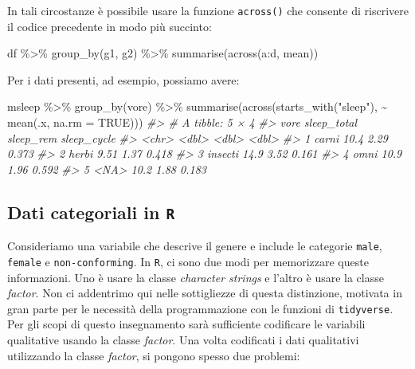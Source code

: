 \documentclass[
  10pt,
  italian,
  a4paper,
  extrafontsizes,onecolumn,openright
  ]{memoir}
\newenvironment{Shaded}{\begin{snugshade}}{\end{snugshade}}
\newcommand{\AttributeTok}[1]{\textcolor[rgb]{0.77,0.63,0.00}{#1}}
\newcommand{\CommentTok}[1]{\textcolor[rgb]{0.56,0.35,0.01}{\textit{#1}}}
\newcommand{\ConstantTok}[1]{\textcolor[rgb]{0.00,0.00,0.00}{#1}}
\newcommand{\FunctionTok}[1]{\textcolor[rgb]{0.00,0.00,0.00}{#1}}
\newcommand{\NormalTok}[1]{#1}
\newcommand{\SpecialCharTok}[1]{\textcolor[rgb]{0.00,0.00,0.00}{#1}}
\newcommand{\StringTok}[1]{\textcolor[rgb]{0.31,0.60,0.02}{#1}}
\begin{document}
\noindent
In tali circostanze è possibile usare la funzione \texttt{across()} che consente di riscrivere il codice precedente in modo più succinto:

\begin{Shaded}
\begin{Highlighting}[]
\NormalTok{df }\SpecialCharTok{\%\textgreater{}\%} 
  \FunctionTok{group\_by}\NormalTok{(g1, g2) }\SpecialCharTok{\%\textgreater{}\%} 
  \FunctionTok{summarise}\NormalTok{(}\FunctionTok{across}\NormalTok{(a}\SpecialCharTok{:}\NormalTok{d, mean))}
\end{Highlighting}
\end{Shaded}

\noindent
Per i dati presenti, ad esempio, possiamo avere:

\begin{Shaded}
\begin{Highlighting}[]
\NormalTok{msleep }\SpecialCharTok{\%\textgreater{}\%}
  \FunctionTok{group\_by}\NormalTok{(vore) }\SpecialCharTok{\%\textgreater{}\%}
  \FunctionTok{summarise}\NormalTok{(}\FunctionTok{across}\NormalTok{(}\FunctionTok{starts\_with}\NormalTok{(}\StringTok{"sleep"}\NormalTok{), }\SpecialCharTok{\textasciitilde{}} \FunctionTok{mean}\NormalTok{(.x, }\AttributeTok{na.rm =} \ConstantTok{TRUE}\NormalTok{)))}
\CommentTok{\#\textgreater{} \# A tibble: 5 × 4}
\CommentTok{\#\textgreater{}   vore    sleep\_total sleep\_rem sleep\_cycle}
\CommentTok{\#\textgreater{}   \textless{}chr\textgreater{}         \textless{}dbl\textgreater{}     \textless{}dbl\textgreater{}       \textless{}dbl\textgreater{}}
\CommentTok{\#\textgreater{} 1 carni         10.4       2.29       0.373}
\CommentTok{\#\textgreater{} 2 herbi          9.51      1.37       0.418}
\CommentTok{\#\textgreater{} 3 insecti       14.9       3.52       0.161}
\CommentTok{\#\textgreater{} 4 omni          10.9       1.96       0.592}
\CommentTok{\#\textgreater{} 5 \textless{}NA\textgreater{}          10.2       1.88       0.183}
\end{Highlighting}
\end{Shaded}

\hypertarget{dati-categoriali-in-r}{%
\subsection{\texorpdfstring{Dati categoriali in \texttt{R}}{Dati categoriali in R}}\label{dati-categoriali-in-r}}

Consideriamo una variabile che descrive il genere e include le categorie \texttt{male}, \texttt{female} e \texttt{non-conforming}. In \texttt{R}, ci sono due modi per memorizzare queste informazioni. Uno è usare la classe \emph{character strings} e l'altro è usare la classe \emph{factor}. Non ci addentrimo qui nelle sottigliezze di questa distinzione, motivata in gran parte per le necessità della programmazione con le funzioni di \texttt{tidyverse}. Per gli scopi di questo insegnamento sarà sufficiente codificare le variabili qualitative usando la classe \emph{factor}. Una volta codificati i dati qualitativi utilizzando la classe \emph{factor}, si pongono spesso due problemi:
\end{document}
